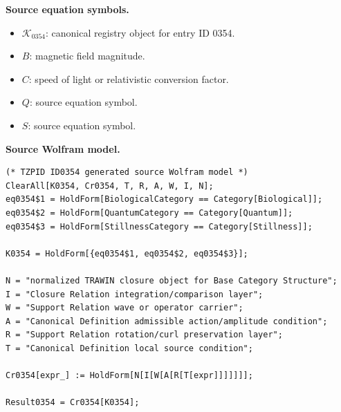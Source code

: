 \begin{minipage}[t]{0.49\linewidth}
\begingroup
\small
\raggedright
\textbf{Source equation symbols.}\par
\begin{itemize}[leftmargin=1.35em,itemsep=1pt,topsep=1pt,parsep=0pt]
    \item $\mathcal{K}_{0354}$: canonical registry object for entry ID 0354.
    \item $B$: magnetic field magnitude.
    \item $C$: speed of light or relativistic conversion factor.
    \item $Q$: source equation symbol.
    \item $S$: source equation symbol.
\end{itemize}
\endgroup
\end{minipage}\hfill
\begin{minipage}[t]{0.47\linewidth}
\begingroup
\scriptsize
\raggedright
\textbf{Source Wolfram model.}\par
\begin{Verbatim}[fontsize=\tiny,breaklines=true,breakanywhere=true]
(* TZPID ID0354 generated source Wolfram model *)
ClearAll[K0354, Cr0354, T, R, A, W, I, N];
eq0354$1 = HoldForm[BiologicalCategory == Category[Biological]];
eq0354$2 = HoldForm[QuantumCategory == Category[Quantum]];
eq0354$3 = HoldForm[StillnessCategory == Category[Stillness]];

K0354 = HoldForm[{eq0354$1, eq0354$2, eq0354$3}];

N = "normalized TRAWIN closure object for Base Category Structure";
I = "Closure Relation integration/comparison layer";
W = "Support Relation wave or operator carrier";
A = "Canonical Definition admissible action/amplitude condition";
R = "Support Relation rotation/curl preservation layer";
T = "Canonical Definition local source condition";

Cr0354[expr_] := HoldForm[N[I[W[A[R[T[expr]]]]]]];

Result0354 = Cr0354[K0354];
\end{Verbatim}
\endgroup
\end{minipage}

